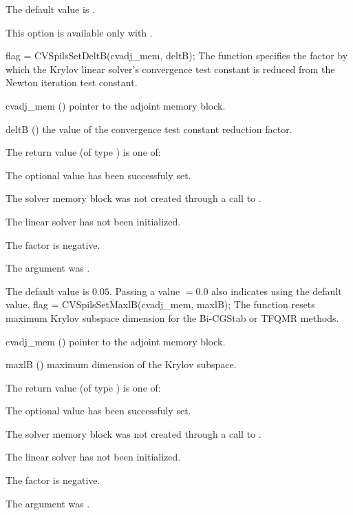 {
  The default value is .

  {\warn}This option is available only with {\cvspgmr}.
}
{
  flag = CVSpilsSetDeltB(cvadj\_mem, deltB);
}
{
  The function  specifies the factor by
  which the Krylov linear solver's convergence test constant is reduced
  from the Newton iteration test constant.
}
{
  \begin{args}
  \item[cvadj\_mem] ()
    pointer to the adjoint memory block.
  \item[deltB] ()
    the value of the convergence test constant reduction factor.
  \end{args}
}
{
  The return value  (of type ) is one of:
  \begin{args}
  \item[\Id{CVSPILS\_SUCCESS}] 
    The optional value has been successfuly set.
  \item[\Id{CVSPILS\_MEM\_NULL}]
    The {\cvodes} solver memory block was not created through a call to .
  \item[\Id{CVSPILS\_LMEM\_NULL}]
    The {\cvspgmr} linear solver has not been initialized.
  \item[\Id{CVSPILS\_ILL\_INPUT}]
    The factor  is negative.  
  \item[\Id{CVSPILS\_ADJMEM\_NULL}]
    The  argument was .
  \end{args}
}
{
  The default value is $0.05$.
  Passing a value $ = 0.0$ also indicates using the default value.
}
{
  flag = CVSpilsSetMaxlB(cvadj\_mem, maxlB);
}
{
  The function  resets maximum Krylov subspace
  dimension for the Bi-CGStab or TFQMR 
  methods.
}
{
  \begin{args}
  \item[cvadj\_mem] ()
    pointer to the adjoint memory block.
  \item[maxlB] ()
    maximum dimension of the Krylov subspace.
  \end{args}
}
{
  The return value  (of type ) is one of:
  \begin{args}
  \item[\Id{CVSPILS\_SUCCESS}] 
    The optional value has been successfuly set.
  \item[\Id{CVSPILS\_MEM\_NULL}]
    The {\cvodes} solver memory block was not created through a call to .
  \item[\Id{CVSPILS\_LMEM\_NULL}]
    The {\cvspgmr} linear solver has not been initialized.
  \item[\Id{CVSPILS\_ILL\_INPUT}]
    The factor  is negative.  
  \item[\Id{CVSPILS\_ADJMEM\_NULL}]
    The  argument was .
  \end{args}
}
